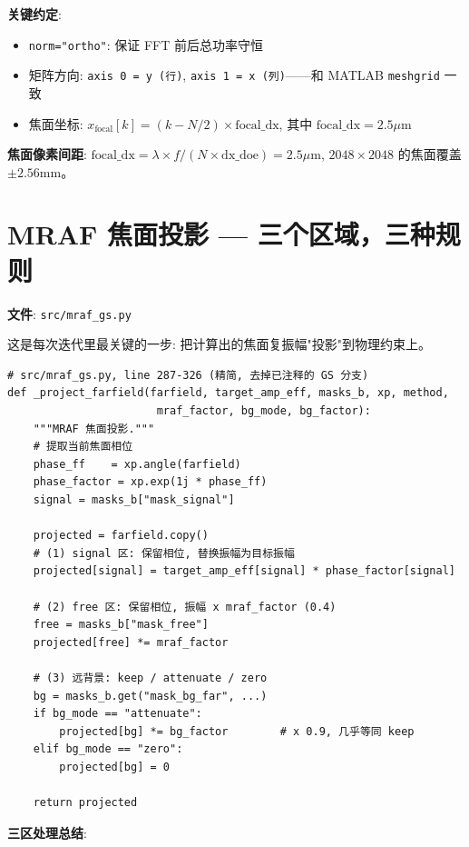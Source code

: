 \documentclass[11pt,a4paper]{ctexart}
\begin{document}
\textbf{关键约定}:
\begin{itemize}[nosep]
  \item \texttt{norm="ortho"}: 保证 FFT 前后总功率守恒
  \item 矩阵方向: \texttt{axis 0 = y (行)}, \texttt{axis 1 = x (列)}——和 MATLAB \texttt{meshgrid} 一致
  \item 焦面坐标: $x_{\text{focal}}[k] = (k - N/2) \times \text{focal\_dx}$, 其中 $\text{focal\_dx} = 2.5\mu\text{m}$
\end{itemize}

\textbf{焦面像素间距}: $\text{focal\_dx} = \lambda \times f / (N \times \text{dx\_doe}) = 2.5\mu\text{m}$, $2048\times2048$ 的焦面覆盖 $\pm 2.56\text{mm}$。

\section{MRAF 焦面投影 — 三个区域，三种规则}

\textbf{文件}: \texttt{src/mraf\_gs.py}

这是每次迭代里最关键的一步: 把计算出的焦面复振幅"投影"到物理约束上。

\begin{lstlisting}
# src/mraf_gs.py, line 287-326 (精简, 去掉已注释的 GS 分支)
def _project_farfield(farfield, target_amp_eff, masks_b, xp, method,
                       mraf_factor, bg_mode, bg_factor):
    """MRAF 焦面投影."""
    # 提取当前焦面相位
    phase_ff    = xp.angle(farfield)
    phase_factor = xp.exp(1j * phase_ff)
    signal = masks_b["mask_signal"]

    projected = farfield.copy()
    # (1) signal 区: 保留相位, 替换振幅为目标振幅
    projected[signal] = target_amp_eff[signal] * phase_factor[signal]

    # (2) free 区: 保留相位, 振幅 x mraf_factor (0.4)
    free = masks_b["mask_free"]
    projected[free] *= mraf_factor

    # (3) 远背景: keep / attenuate / zero
    bg = masks_b.get("mask_bg_far", ...)
    if bg_mode == "attenuate":
        projected[bg] *= bg_factor        # x 0.9, 几乎等同 keep
    elif bg_mode == "zero":
        projected[bg] = 0

    return projected
\end{lstlisting}

\textbf{三区处理总结}:
\end{document}

